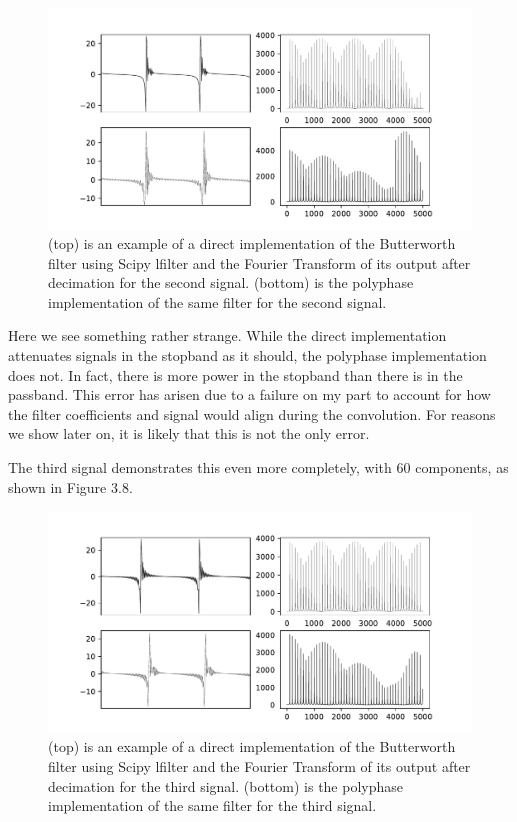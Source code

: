 \documentclass{report}
\begin{document}
\begin{figure}[ht]
\includegraphics[scale=.55]{Figure_8.pdf}
\caption{(top) is an example of a direct implementation of the Butterworth filter using Scipy lfilter and the Fourier Transform of its output after decimation for the second signal. (bottom) is the polyphase implementation of the same filter for the second signal.}
\end{figure} 

Here we see something rather strange.  While the direct implementation attenuates signals in the stopband as it should, the polyphase implementation does not.  In fact, there is more power in the stopband than there is in the passband.  This error has arisen due to a failure on my part to account for how the filter coefficients and signal would align during the convolution.  For reasons we show later on, it is likely that this is not the only error.

The third signal demonstrates this even more completely, with 60 components, as shown in Figure 3.8.

\begin{figure}[ht]
\includegraphics[scale=.55]{Figure_7.pdf}
\caption{(top) is an example of a direct implementation of the Butterworth filter using Scipy lfilter and the Fourier Transform of its output after decimation for the third signal. (bottom) is the polyphase implementation of the same filter for the third signal.}
\end{figure} 
\end{document}
